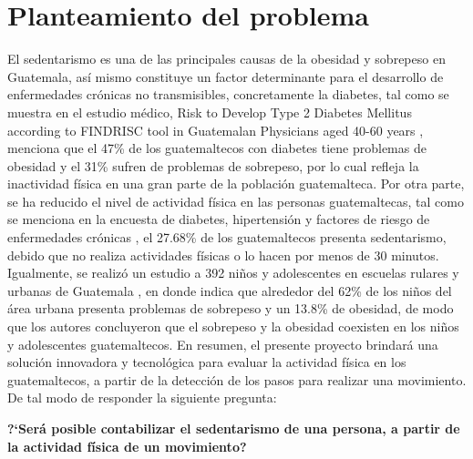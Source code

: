 \chapter{Planteamiento del problema}
El sedentarismo es una de las principales causas de la obesidad y sobrepeso en Guatemala, as\'i mismo constituye un factor determinante para el desarrollo de enfermedades cr\'onicas no transmisibles, concretamente la diabetes, tal como se muestra en el estudio m\'edico, Risk to Develop Type 2 Diabetes Mellitus according to FINDRISC tool in Guatemalan Physicians aged 40-60 years \cite{castro2017risk}, menciona que el 47\% de los guatemaltecos con diabetes tiene problemas de obesidad y el 31\%  sufren de problemas de sobrepeso, por lo cual refleja la inactividad f\'isica en una gran parte de la poblaci\'on guatemalteca.
\medbreak
Por otra parte, se ha reducido el nivel de actividad f\'isica en las personas guatemaltecas, tal como se menciona en la encuesta de diabetes, hipertensi\'on y factores de riesgo de enfermedades cr\'onicas \cite{orellana2006organizacion}, el 27.68\% de los guatemaltecos presenta sedentarismo, debido que no realiza actividades f\'isicas o lo hacen por menos de 30 minutos.
\medbreak
Igualmente, se realiz\'o un estudio a 392 ni\~nos y adolescentes en escuelas rulares y urbanas de Guatemala \cite{orellana2006organizacion}, en donde indica que alrededor del 62\% de los ni\~nos del  \'area urbana presenta problemas de sobrepeso y un 13.8\% de obesidad, de modo que los autores concluyeron que el sobrepeso y la obesidad coexisten en los ni\~nos y adolescentes guatemaltecos.
\medbreak
En resumen, el presente proyecto brindar\'a una soluci\'on innovadora y tecnol\'ogica para evaluar la actividad f\'isica en los guatemaltecos, a partir de la detecci\'on de los pasos para realizar una movimiento. De tal modo de responder la siguiente pregunta:
\medbreak
\begin{center}
\textbf{?`Ser\'a posible contabilizar el sedentarismo de una persona, a partir de la actividad f\'isica de un movimiento?}
\end{center}






